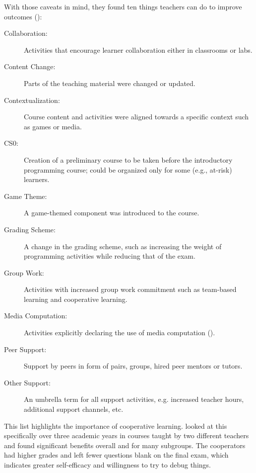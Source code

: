 With those caveats in mind,
they found ten things teachers can do to improve outcomes ():

\begin{description}

\item[Collaboration:]
  Activities that encourage learner collaboration either in classrooms or labs.

\item[Content Change:]
  Parts of the teaching material were changed or updated.

\item[Contextualization:]
  Course content and activities were aligned towards a specific context such as games or media.

\item[CS0:]
  Creation of a preliminary course to be taken before the introductory programming course;
  could be organized only for some (e.g., at-risk) learners.

\item[Game Theme:]
  A game-themed component was introduced to the course.

\item[Grading Scheme:]
  A change in the grading scheme,
  such as increasing the weight of programming activities while reducing that of the exam.

\item[Group Work:]
  Activities with increased group work commitment such as team-based learning and cooperative learning.

\item[Media Computation:]
  Activities explicitly declaring the use of media computation ().

\item[Peer Support:]
  Support by peers in form of pairs, groups, hired peer mentors or tutors.

\item[Other Support:]
  An umbrella term for all support activities,
  e.g. increased teacher hours, additional support channels, etc.

\end{description}


This list highlights the importance of cooperative learning.
\cite{Beck2013} looked at this specifically over three academic years in courses taught by two different teachers
and found significant benefits overall and for many subgroups.
The cooperators had higher grades
and left fewer questions blank on the final exam,
which indicates greater self-efficacy and willingness to try to debug things.

